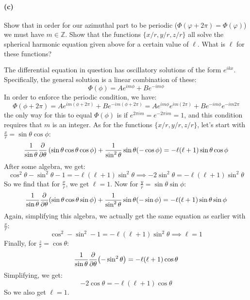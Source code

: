 \documentclass{article}
\begin{document}
\paragraph{(c)}		\extrapart
Show that in order for our azimuthal part to be periodic ($\Phi(\varphi+2\pi)=\Phi(\varphi)$) we must have $m\in\mathbb{Z}$.
Show that the functions $\{x/r, y/r, z/r\}$ all solve the spherical harmonic equation given above for a certain value of $\ell$.  What is $\ell$ for these functions?

\begin{solution}
	The differential equation in question has oscillatory solutions of the form $e^{ikx}$. Specifically, 
	the general solution is a linear combination of these:
	\[
		\Phi(\phi) = Ae^{im \phi} + Be^{- im \phi}
	\] 
	In order to enforce the periodic condition, we have:
	\[
		\Phi(\phi + 2\pi) = Ae^{im (\phi + 2\pi)} + Be^{-im(\phi + 2\pi)} = Ae^{im \phi} e^{im(2\pi)} 
		+ Be^{-im \phi} e^{-im 2\pi}
	\] 
	the only way for this to equal $\Phi(\phi)$ is if $e^{2\pi i m} = e^{- 2\pi i m} = 1$, and this condition 
	requires that $m$ is an integer. As for the functions $\{x / r, y / r, z /r\}$, let's start with 
	$\frac{x}{r} = \sin \theta \cos \phi$:
	\[
		\frac{1}{\sin \theta}\pdv{\theta}\left( \sin \theta \cos \theta \cos \phi \right) 
		+ \frac{1}{\sin^2 \theta} \sin \theta (-\cos \phi) = -\ell(\ell+1)\sin \theta \cos \phi 
	\]
	After some algebra, we get:
	\[
	\cos^2 \theta - \sin^2 \theta - 1 = -\ell(\ell+1)\sin^2 \theta \implies -2 \sin^2 \theta = -\ell(\ell+1)
	\sin^2 \theta 
	\] 
	So we find that for $\frac{x}{r}$, we get $\ell= 1$. Now for $\frac{y}{r} = \sin \theta \sin \phi$:
	\[
		\frac{1}{\sin \theta}\pdv{\theta}(\sin \theta \cos \theta \sin \phi) 
		+ \frac{1}{\sin^2 \theta}\sin \theta (- \sin \phi) = -\ell(\ell+1) \sin \theta \sin \phi
	\] 
	Again, simplifying this algebra, we actually get the same equation as earlier with $\frac{x}{r}$:
	\[
	\cos^2 - \sin^2 - 1 = -\ell(\ell+1) \sin^2 \theta \implies \ell = 1
	\] 
	Finally, for $\frac{z}{r} = \cos \theta$:
	\[
		\frac{1}{\sin \theta}\pdv{\theta}(-\sin^2 \theta) = -\ell(\ell+1) \cos \theta
	\] 
	Simplifying, we get:
	\[
	-2 \cos \theta = -\ell(\ell+1) \cos \theta 
	\] 
	So we also get $\ell = 1$. 
\end{solution}


\endofhomework
\addfooter
\end{document}
